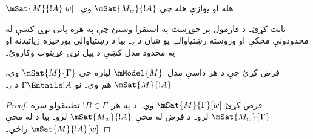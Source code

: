\documentclass[../../../include/open-logic-section]{subfiles}
\begin{document}
\begin{prop}
  $\mSat{M}{!A}[w]$ هله او يوازې هله چې $\mSat{M_w}{!A}$ وي۔
\end{prop}

\begin{prob}
   ثابت کړئ۔ د فارمول پر
  جوړښت په استقرا وښيئ چې په هره پاتې نړۍ کښې له محدودونې مخکې
  او وروسته رښتياوالے يو شان دے۔ بيا د رښتياوالي يورخيزه
  زياتېدنه او په محدود مدل کښې د پيل نړۍ غړيتوب وکاروئ۔
\end{prob}

\begin{prop}
  فرض کړئ چې د هر داسې مدل~$\mModel{M}$ لپاره چې
  $\mSat{M}{\Gamma}$ وي، $\mSat{M}{!A}$ هم وي۔ نو
  $\Gamma \Entails !A$ دے۔
\end{prop}

\begin{proof}
  فرض کړئ $\mSat{M}{\Gamma}[w]$ وي۔ د
   په هر~$!B \in \Gamma$ تطبيقولو سره
  $\mSat{M_w}{\Gamma}$ لرو۔ د فرض له مخې
  $\mSat{M_w}{!A}$ لرو۔ بيا د  له مخې
  $\mSat{M}{!A}[w]$ راځي۔
\end{proof}
\end{document}
